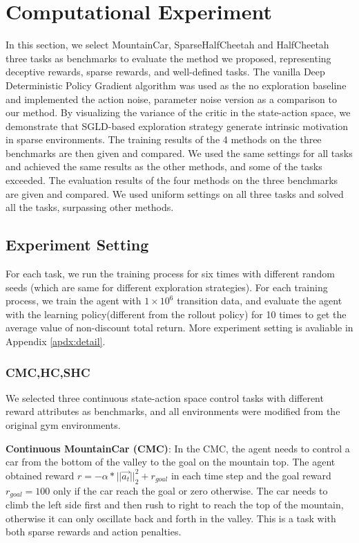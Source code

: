 \section{Computational Experiment}
In this section, we select MountainCar, SparseHalfCheetah and HalfCheetah three tasks as benchmarks to evaluate the method we proposed, representing deceptive rewards, sparse rewards, and well-defined tasks. The vanilla Deep Deterministic Policy Gradient algorithm was used as the no exploration baseline and implemented the action noise, parameter noise version as a comparison to our method. By visualizing the variance of the critic in the state-action space, we demonstrate that SGLD-based exploration strategy generate intrinsic motivation in sparse environments. The training results of the 4 methods on the three benchmarks are then given and compared. We used the same settings for all tasks and achieved the same results as the other methods, and some of the tasks exceeded. The evaluation results of the four methods on the three benchmarks are given and compared. We used uniform settings on all three tasks and solved all the tasks, surpassing other methods.

\subsection{Experiment Setting}
For each task, we run the training process for six times with different random seeds (which are same for different exploration strategies). For each training process, we train the agent with $1\times10^6$ transition data, and evaluate the agent with the learning policy(different from the rollout policy) for 10 times to get the average value of non-discount total return. More experiment setting is avaliable in Appendix \ref{apdx:detail}.

\subsubsection{CMC,HC,SHC}
We selected three continuous state-action space control tasks with different reward attributes as benchmarks, and all environments were modified from the original gym environments.

\textbf{Continuous MountainCar (CMC)}: In the CMC, the agent needs to control a car from the bottom of the valley to the goal on the mountain top. The agent obtained reward $r = -\alpha*||\vec{a_t}||^2_2 + r_{goal}$ in each time step and the goal reward $r_{goal}=100$ only if the car reach the goal or zero otherwise. The car needs to climb the left side first and then rush to right to reach the top of the mountain, otherwise it can only oscillate back and forth in the valley. This is a task with both sparse rewards and action penalties.

